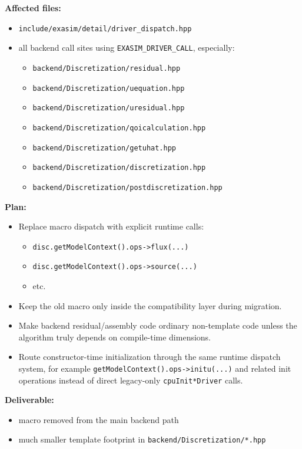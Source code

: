 \documentclass[11pt]{article}
\begin{document}
\textbf{Affected files:}
\begin{itemize}[leftmargin=*]
\item \texttt{include/exasim/detail/driver\_dispatch.hpp}
\item all backend call sites using \texttt{EXASIM\_DRIVER\_CALL}, especially:
\begin{itemize}[leftmargin=*]
\item \texttt{backend/Discretization/residual.hpp}
\item \texttt{backend/Discretization/uequation.hpp}
\item \texttt{backend/Discretization/uresidual.hpp}
\item \texttt{backend/Discretization/qoicalculation.hpp}
\item \texttt{backend/Discretization/getuhat.hpp}
\item \texttt{backend/Discretization/discretization.hpp}
\item \texttt{backend/Discretization/postdiscretization.hpp}
\end{itemize}
\end{itemize}

\textbf{Plan:}
\begin{itemize}[leftmargin=*]
\item Replace macro dispatch with explicit runtime calls:
\begin{itemize}[leftmargin=*]
\item \texttt{disc.getModelContext().ops->flux(...)}
\item \texttt{disc.getModelContext().ops->source(...)}
\item etc.
\end{itemize}
\item Keep the old macro only inside the compatibility layer during migration.
\item Make backend residual/assembly code ordinary non-template code unless the algorithm truly depends on compile-time dimensions.
\item Route constructor-time initialization through the same runtime dispatch system, for example \texttt{getModelContext().ops->initu(...)} and related init operations instead of direct legacy-only \texttt{cpuInit*Driver} calls.
\end{itemize}

\textbf{Deliverable:}
\begin{itemize}[leftmargin=*]
\item macro removed from the main backend path
\item much smaller template footprint in \texttt{backend/Discretization/*.hpp}
\end{itemize}
\end{document}
